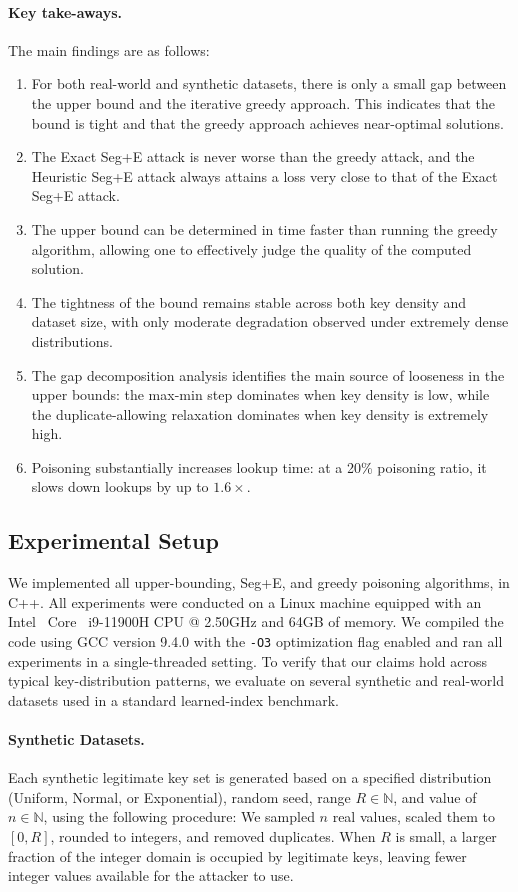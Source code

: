 \documentclass[acmsmall]{acmart}
\begin{document}
\paragraph{Key take-aways.} The main findings are as follows:
\begin{enumerate}[leftmargin=1.5em]
\item For both real-world and synthetic datasets, there is only a small gap between the upper bound and the iterative greedy approach. This indicates that the bound is tight and that the greedy approach achieves near-optimal solutions.
\item The Exact Seg+E attack is never worse than the greedy attack, and the Heuristic Seg+E attack always attains a loss very close to that of the Exact Seg+E attack.
\item The upper bound can be determined in time faster than running the greedy algorithm, allowing one to effectively judge the quality of the computed solution.
\item The tightness of the bound remains stable across both key density and dataset size, with only moderate degradation observed under extremely dense distributions.
\item The gap decomposition analysis identifies the main source of looseness in the upper bounds: the max-min step dominates when key density is low, while the duplicate-allowing relaxation dominates when key density is extremely high.
\item Poisoning substantially increases lookup time: at a 20\% poisoning ratio, it slows down lookups by up to $1.6\times$.
\end{enumerate}

\subsection{Experimental Setup}

We implemented all upper-bounding, Seg+E, and greedy poisoning algorithms, in C++.
All experiments were conducted on a Linux machine equipped with an Intel\textregistered~ Core\texttrademark~ i9-11900H CPU @ 2.50GHz and 64GB of memory.
We compiled the code using GCC version 9.4.0 with the \texttt{-O3} optimization flag enabled and ran all experiments in a single-threaded setting.
To verify that our claims hold across typical key-distribution patterns, we evaluate on several synthetic and real-world datasets used in a standard learned-index benchmark.

\paragraph{Synthetic Datasets.}
Each synthetic legitimate key set is generated based on a specified distribution (Uniform, Normal, or Exponential), random seed, range $R \in \mathbb{N}$, and value of $n \in \mathbb{N}$, using the following procedure:
We sampled $n$ real values, scaled them to $[0, R]$, rounded to integers, and removed duplicates.
When $R$ is small, a larger fraction of the integer domain is occupied by legitimate keys, leaving fewer integer values available for the attacker to use.
\end{document}
